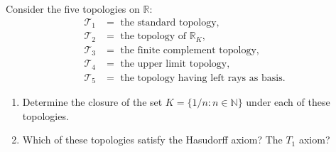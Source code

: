 \documentclass[a4paper,12pt, reqno]{article}
\theoremstyle{definition}
\newenvironment{exerr}[1]{
  \renewcommand\theexeralt{#1}
  \exeralt
}{\endexeralt}
\newcommand{\R}{\mathbb{R}}
\newcommand{\T}{\mathscr{T}}
\newcommand{\N}{\mathbb{N}}
\begin{document}
\begin{exerr}{16}
  Consider the five topologies on $\R$:
  \begin{align*}
    \T_{1} & = \text{ the standard topology},                  \\
    \T_{2} & = \text{ the topology of $\R_K$},                 \\
    \T_{3} & = \text{ the finite complement topology},         \\
    \T_{4} & = \text{ the upper limit topology},               \\
    \T_{5} & = \text{ the topology having left rays as basis}.
  \end{align*}
  \begin{enumerate}[label = (\alph*)]
    \item Determine the closure of the set $K = \{ 1/n : n\in\N \}$ under each of these topologies.
    \item Which of these topologies satisfy the Hasudorff axiom? The $T_{1}$ axiom?
  \end{enumerate}
\end{exerr}
\end{document}
